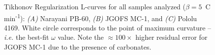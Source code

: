 \begin{figure}[p]
	\caption[Tikhonov Regularization L-curves for all samples analyzed]{Tikhonov Regularization L-curves for all samples analyzed ($\beta = 5$\textdegree\ C min\textsuperscript{-1}): \textit{(A)} Narayani PB-60, \textit{(B)} JGOFS MC-1, and \textit{(C)} Pololu 4169. White circle corresponds to the point of maximum curvature -- \textit{i.e.} the best-fit $\omega$ value. Note the $\approx 100 \times$ higher residual error for JGOFS MC-1 due to the presence of carbonates.}
	\label{Ch3Fig:6} 
\end{figure}

